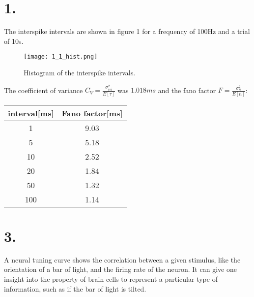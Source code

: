 \section*{1.}
The interspike intervals are shown in figure 1 for a frequency of 100Hz and a trial of 10s.
\begin{figure}[H]
\label{interspike_hist:fig}
\texttt{[image: 1\_1\_hist.png]} 
\caption{Histogram of the interspike intervals.}
\end{figure}
The coefficient of variance $C_V = \frac{\sigma_{isi}^2}{E[\tau]}$ was $1.018ms$ and the fano factor $F = \frac{\sigma_n^2}{E[n]}$:
\begin{center}
\begin{tabular}{|c|c|}
\hline
interval[ms] & Fano factor[ms]\\ \hline
1 & 9.03 \\ \hline
5 & 5.18 \\ \hline
10 & 2.52 \\ \hline
20 & 1.84 \\ \hline
50 & 1.32 \\ \hline
100 & 1.14 \\ \hline
\end{tabular}
\end{center}


\section*{3.}
A neural tuning curve shows the correlation between a given stimulus, like the orientation of a bar of light, and the firing rate of the neuron.
It can give one insight into the property of brain cells to represent a particular type of information, such as if the bar of light is tilted.
